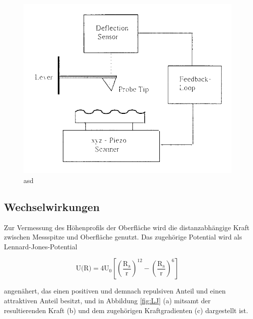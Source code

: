        \begin{figure}[h]
          \centering
          \includegraphics[width = 1\textwidth]{pictures/prinzip.png}
          \caption{asd}
          \label{fig:prinzip}
        \end{figure}
    
        \FloatBarrier


      \subsection{Wechselwirkungen}
        Zur Vermessung des Höhenprofils der Oberfläche wird die distanzabhängige Kraft zwischen Messspitze und Oberfläche genutzt. Das zugehörige Potential wird als Lennard-Jones-Potential 
        
        \begin{equation*}
          \text{U(R)} = 4\text{U}_0 \left[ \left(\frac{\text{R}_{\text{a}}}{\text{r}}\right)^{12} - \left(\frac{\text{R}_{\text{a}}}{\text{r}}\right)^{6} \right]
        \end{equation*}
        
        angenähert, das einen positiven und demnach repulsiven Anteil und einen attraktiven Anteil besitzt, und in Abbildung \ref{fig:LJ} (a) mitsamt der resultierenden Kraft (b) und dem zugehörigen
        Kraftgradienten (c) dargestellt ist.

        \FloatBarrier

